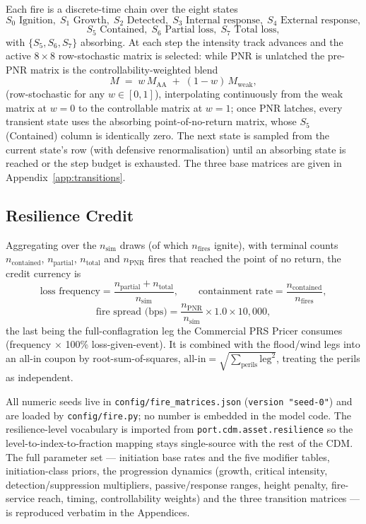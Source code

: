 \documentclass[11pt,a4paper]{article}
\begin{document}
Each fire is a discrete-time chain over the eight states
\[
S_0\text{ Ignition},\;S_1\text{ Growth},\;S_2\text{ Detected},\;
S_3\text{ Internal response},\;S_4\text{ External response},
\]
\[
S_5\text{ Contained},\;S_6\text{ Partial loss},\;S_7\text{ Total loss},
\]
with $\{S_5,S_6,S_7\}$ absorbing. At each step the intensity track advances and
the active $8\times8$ row-stochastic matrix is selected: while PNR is unlatched
the pre-PNR matrix is the controllability-weighted blend
\[
M \;=\; w\,M_{\text{AA}} \;+\; (1-w)\,M_{\text{weak}},
\]
(row-stochastic for any $w\in[0,1]$), interpolating continuously from the weak
matrix at $w=0$ to the controllable matrix at $w=1$; once PNR latches, every
transient state uses the absorbing point-of-no-return matrix, whose $S_5$
(Contained) column is identically zero. The next state is sampled from the
current state's row (with defensive renormalisation) until an absorbing state is
reached or the step budget is exhausted. The three base matrices are given in
Appendix~\ref{app:transitions}.

\subsection{Resilience Credit}

Aggregating over the $n_{\text{sim}}$ draws (of which $n_{\text{fires}}$
ignite), with terminal counts $n_{\text{contained}}$, $n_{\text{partial}}$,
$n_{\text{total}}$ and $n_{\text{PNR}}$ fires that reached the point of no
return, the credit currency is
\[
\text{loss frequency} = \frac{n_{\text{partial}}+n_{\text{total}}}{n_{\text{sim}}},
\qquad
\text{containment rate} = \frac{n_{\text{contained}}}{n_{\text{fires}}},
\]
\[
\text{fire spread (bps)} =
   \frac{n_{\text{PNR}}}{n_{\text{sim}}}\times 1.0 \times 10{,}000,
\]
the last being the full-conflagration leg the Commercial PRS Pricer consumes
(frequency $\times$ 100\% loss-given-event). It is combined with the flood/wind
legs into an all-in coupon by root-sum-of-squares,
$\text{all-in} = \sqrt{\sum_{\text{perils}} \text{leg}^2}$, treating the perils
as independent.

\mkminputs

All numeric seeds live in \texttt{config/fire\_matrices.json}
(\texttt{version "seed-0"}) and are loaded by \texttt{config/fire.py}; no number
is embedded in the model code. The resilience-level vocabulary is imported from
\texttt{port.cdm.asset.resilience} so the level-to-index-to-fraction
mapping stays single-source with the rest of the CDM. The full
parameter set --- initiation base rates and the five modifier tables,
initiation-class priors, the progression dynamics (growth, critical intensity,
detection/suppression multipliers, passive/response ranges, height penalty,
fire-service reach, timing, controllability weights) and the three transition
matrices --- is reproduced verbatim in the Appendices.
\end{document}
